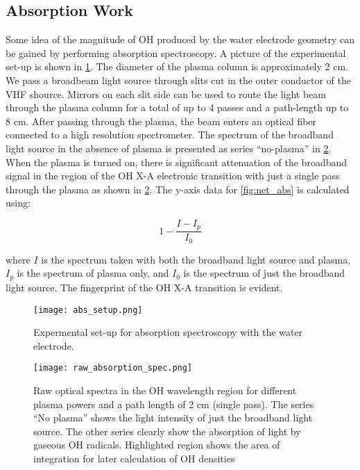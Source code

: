 \subsection{Absorption Work}
\label{sec:absorption}

Some idea of the magnitude of OH produced by the water electrode geometry can be gained by performing absorption spectroscopy. A picture of the experimental set-up is shown in \cref{fig:expt_abs}. The diameter of the plasma column is approximately 2 cm. We pass a broadbeam light source through slits cut in the outer conductor of the VHF shource. Mirrors on each slit side can be used to route the light beam through the plasma column for a total of up to 4 passes and a path-length up to 8 cm. After passing through the plasma, the beam enters an optical fiber connected to a high resolution spectrometer. The spectrum of the broadband light source in the absence of plasma is presented as series ``no-plasma'' in \cref{fig:raw_abs}. When the plasma is turned on, there is significant attenuation of the broadband signal in the region of the OH X-A electronic transition with just a single pass through the plasma as shown in \cref{fig:raw_abs}. The y-axis data for \cref{fig:net_abs} is calculated using:

\begin{equation}
  1 - \frac{I-I_p}{I_0}
  \label{eq:absorp}
\end{equation}

where $I$ is the spectrum taken with both the broadband light source and plasma, $I_p$ is the spectrum of plasma only, and $I_0$ is the spectrum of just the broadband light source. The fingerprint of the OH X-A transition is evident.

\begin{figure}[htbp]
  \centering
  \texttt{[image: abs\_setup.png]}
  \caption{Expermental set-up for absorption spectroscopy with the water electrode.}
  \label{fig:expt_abs}
\end{figure}

\begin{figure}[htbp]
  \centering
  \texttt{[image: raw\_absorption\_spec.png]}
  \caption{Raw optical spectra in the OH wavelength region for different plasma powers and a path length of 2 cm (single pass). The series ``No plasma'' shows the light intensity of just the broadband light source. The other series clearly show the absorption of light by gaseous OH radicals. Highlighted region shows the area of integration for later calculation of OH densities}
  \label{fig:raw_abs}
\end{figure}

